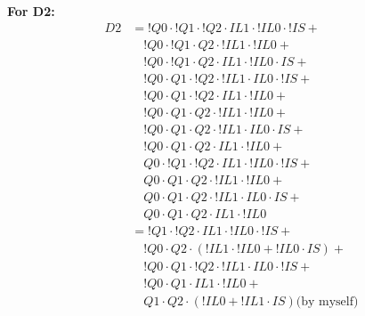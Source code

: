 \begin{multicols}{2}
    \textbf{For D2:}
    \begin{align*}
        D2  &=     !Q0 \cdot !Q1 \cdot !Q2 \cdot  IL1 \cdot !IL0 \cdot !IS + \\
            &\quad !Q0 \cdot !Q1 \cdot  Q2 \cdot !IL1 \cdot !IL0 + \\
            &\quad !Q0 \cdot !Q1 \cdot  Q2 \cdot  IL1 \cdot !IL0 \cdot  IS + \\
            &\quad !Q0 \cdot  Q1 \cdot !Q2 \cdot !IL1 \cdot  IL0 \cdot !IS + \\
            &\quad !Q0 \cdot  Q1 \cdot !Q2 \cdot  IL1 \cdot !IL0 + \\
            &\quad !Q0 \cdot  Q1 \cdot  Q2 \cdot !IL1 \cdot !IL0 + \\
            &\quad !Q0 \cdot  Q1 \cdot  Q2 \cdot !IL1 \cdot  IL0 \cdot  IS + \\
            &\quad !Q0 \cdot  Q1 \cdot  Q2 \cdot  IL1 \cdot !IL0 + \\
            &\quad  Q0 \cdot !Q1 \cdot !Q2 \cdot  IL1 \cdot !IL0 \cdot !IS + \\
            &\quad  Q0 \cdot  Q1 \cdot  Q2 \cdot !IL1 \cdot !IL0 + \\
            &\quad  Q0 \cdot  Q1 \cdot  Q2 \cdot !IL1 \cdot  IL0 \cdot  IS + \\
            &\quad  Q0 \cdot  Q1 \cdot  Q2 \cdot  IL1 \cdot !IL0 \\
           &=     !Q1 \cdot !Q2 \cdot  IL1 \cdot !IL0 \cdot !IS + \\
           &\quad !Q0 \cdot  Q2 \cdot (!IL1 \cdot !IL0 + !IL0 \cdot  IS) + \\
           &\quad !Q0 \cdot  Q1 \cdot !Q2  \cdot !IL1 \cdot  IL0 \cdot !IS + \\
           &\quad !Q0 \cdot  Q1 \cdot  IL1 \cdot !IL0 + \\
           &\quad  Q1 \cdot  Q2 \cdot (!IL0 + !IL1 \cdot  IS) \text{(by myself)} \\

\end{align*}
\end{multicols}
